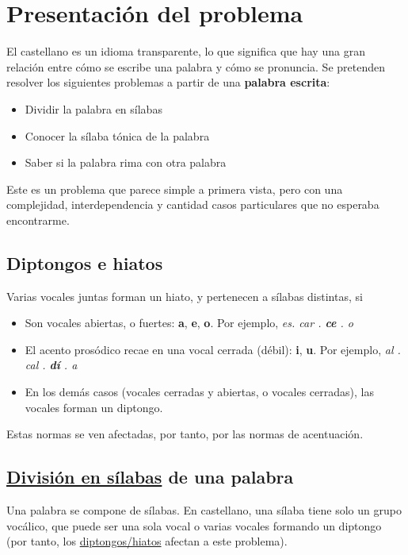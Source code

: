 \documentclass[11pt]{article}
\author{alvaro}
\date{\today}
\title{}
\begin{document}
\tableofcontents

\section{Presentación del problema}
\label{sec:org000001b}

El castellano es un idioma transparente, lo que significa que hay una gran relación entre cómo se escribe una palabra y cómo se pronuncia. Se pretenden resolver los siguientes problemas a partir de una \textbf{palabra escrita}:
\begin{itemize}
\item Dividir la palabra en sílabas
\item Conocer la sílaba tónica de la palabra
\item Saber si la palabra rima con otra palabra
\end{itemize}

Este es un problema que parece simple a primera vista, pero con una complejidad, interdependencia y cantidad casos particulares que no esperaba encontrarme.


\begin{center}

\end{center}



\subsection{\label{diptongos-hiatos} Diptongos e hiatos}
\label{sec:org0000000}
Varias vocales juntas forman un hiato, y pertenecen a sílabas distintas, si
\begin{itemize}
\item Son vocales abiertas, o fuertes: \textbf{a}, \textbf{e}, \textbf{o}. Por ejemplo, \emph{es. car . \textbf{ce} . o}
\item El acento prosódico recae en una vocal cerrada (débil): \textbf{i}, \textbf{u}. Por ejemplo, \emph{al . cal . \textbf{dí} . a}
\item En los demás casos (vocales cerradas y abiertas, o vocales cerradas), las vocales forman un diptongo.
\end{itemize}

Estas normas se ven afectadas, por tanto, por las normas de acentuación.


\subsection{\label{separar-silabas} \href{http://tulengua.es/es/separar-en-silabas}{División en sílabas} de una palabra}
\label{sec:org0000009}
Una palabra se compone de sílabas. En castellano, una sílaba tiene solo un grupo vocálico, que puede ser una sola vocal o varias vocales formando un diptongo (por tanto, los \hyperref[diptongos-hiatos]{diptongos/hiatos} afectan a este problema).
\end{document}
